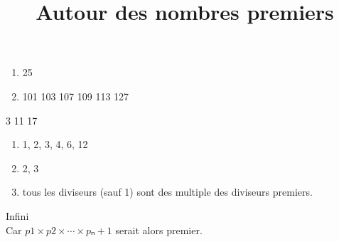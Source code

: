\documentclass[a4paper,12pt]{article}
\title{Autour des nombres premiers}
\date{}
\author{}
\begin{document}
\maketitle

\begin{exercice}
	\begin{enumerate}
		\item 25
		\item 101 103 107 109 113 127
	\end{enumerate}
\end{exercice}

\begin{exercice}
	3 11 17
\end{exercice}

\begin{exercice}
	\begin{enumerate}
		\item 1, 2, 3, 4, 6, 12
		\item 2, 3
		\item tous les diviseurs (sauf 1) sont des multiple des diviseurs premiers.
	\end{enumerate}
\end{exercice}

\begin{exercice}[(avancé)\\]
	Infini \\
	Car $p1×p2×⋯×pₙ + 1$ serait alors premier.
\end{exercice}
\end{document}
